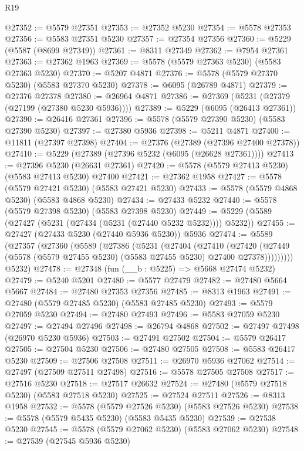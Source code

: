\begin{lexlean}{R19}
\begin{coremodule}
@27352 := @5579 @27351
@27353 := @27352 @5230
@27354 := @5578 @27353
@27356 := @5583 @27351 @5230
@27357 := @27354 @27356
@27360 := @5229 (@5587 (@8699 @27349))
@27361 := @8311 @27349
@27362 := @7954 @27361
@27363 := @27362 @1963
@27369 := @5578 (@5579 @27363 @5230) (@5583 @27363 @5230)
@27370 := @5207 @4871
@27376 := @5578 (@5579 @27370 @5230) (@5583 @27370 @5230)
@27378 := @6095 (@26789 @4871)
@27379 := @27376 @27378
@27380 := @26964 @4871
@27386 := @27369 (@5231 (@27379 (@27199 (@27380 @5230 @5936))))
@27389 := @5229 (@6095 (@26413 @27361))
@27390 := @26416 @27361
@27396 := @5578 (@5579 @27390 @5230) (@5583 @27390 @5230)
@27397 := @27380 @5936
@27398 := @5211 @4871
@27400 := @11811 (@27397 @27398)
@27404 := @27376 (@27389 (@27396 @27400 @27378))
@27410 := @5229 (@27389 (@27396 @5232 (@6095 (@26628 @27361))))
@27413 := @27396 @5230 (@26631 @27361)
@27420 := @5578 (@5579 @27413 @5230) (@5583 @27413 @5230) @27400
@27421 := @27362 @1958
@27427 := @5578 (@5579 @27421 @5230) (@5583 @27421 @5230)
@27433 := @5578 (@5579 @4868 @5230) (@5583 @4868 @5230)
@27434 := @27433 @5232
@27440 := @5578 (@5579 @27398 @5230) (@5583 @27398 @5230)
@27449 := @5229 (@5589 (@27427 (@5231 (@27434 (@5231 (@27440 @5232 @5232)))) @5232))
@27455 := @27427 (@27433 @5230 (@27440 @5936 @5230)) @5936
@27474 := @5589
    (@27357
      (@27360
        (@5589
          (@27386
            (@5231
              (@27404
                (@27410
                  (@27420
                    (@27449 (@5578 (@5579 @27455 @5230) (@5583 @27455 @5230) @27400 @27378)))))))))
      @5232)
@27478 := @27348 (fun (__b : @5225) => @5668 @27474 @5232)
@27479 := @5240 @5201
@27480 := @5577 @27479
@27482 := @27480 @5664 @5667
@27484 := @27480 @27353 @27356
@27485 := @8313 @1963
@27491 := @27480 (@5579 @27485 @5230) (@5583 @27485 @5230)
@27493 := @5579 @27059 @5230
@27494 := @27480 @27493
@27496 := @5583 @27059 @5230
@27497 := @27494 @27496
@27498 := @26794 @4868
@27502 := @27497 @27498 (@26970 @5230 @5936)
@27503 := @27491 @27502
@27504 := @5579 @26417
@27505 := @27504 @5230
@27506 := @27480 @27505
@27508 := @5583 @26417 @5230
@27509 := @27506 @27508
@27511 := @26970 @5936 @27062
@27514 := @27497 (@27509 @27511 @27498)
@27516 := @5578 @27505 @27508
@27517 := @27516 @5230
@27518 := @27517 @26632
@27524 := @27480 (@5579 @27518 @5230) (@5583 @27518 @5230)
@27525 := @27524 @27511
@27526 := @8313 @1958
@27532 := @5578 (@5579 @27526 @5230) (@5583 @27526 @5230)
@27538 := @5578 (@5579 @5435 @5230) (@5583 @5435 @5230)
@27539 := @27538 @5230
@27545 := @5578 (@5579 @27062 @5230) (@5583 @27062 @5230)
@27548 := @27539 (@27545 @5936 @5230)

\end{coremodule}
\end{lexlean}
